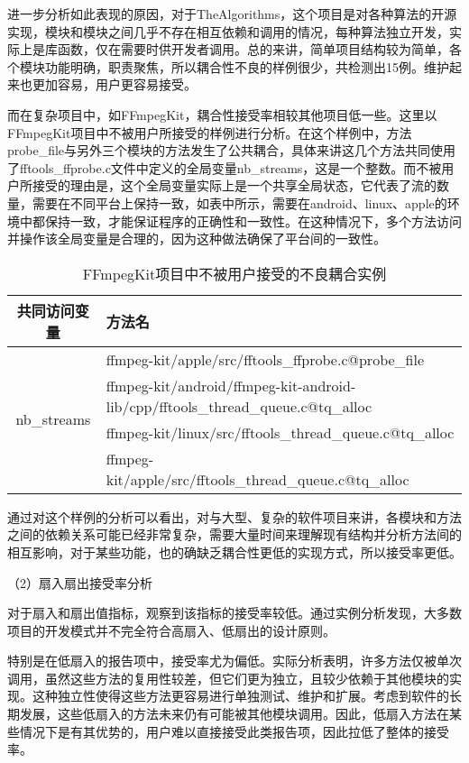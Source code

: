 进一步分析如此表现的原因，对于TheAlgorithms，这个项目是对各种算法的开源实现，模块和模块之间几乎不存在相互依赖和调用的情况，每种算法独立开发，实际上是库函数，仅在需要时供开发者调用。总的来讲，简单项目结构较为简单，各个模块功能明确，职责聚焦，所以耦合性不良的样例很少，共检测出15例。维护起来也更加容易，用户更容易接受。

而在复杂项目中，如FFmpegKit，耦合性接受率相较其他项目低一些。这里以FFmpegKit项目中不被用户所接受的样例进行分析。在这个样例中，方法probe\_file与另外三个模块的方法发生了公共耦合，具体来讲这几个方法共同使用了fftools\_ffprobe.c文件中定义的全局变量nb\_streams，这是一个整数。而不被用户所接受的理由是，这个全局变量实际上是一个共享全局状态，它代表了流的数量，需要在不同平台上保持一致，如表中所示，需要在android、linux、apple的环境中都保持一致，才能保证程序的正确性和一致性。在这种情况下，多个方法访问并操作该全局变量是合理的，因为这种做法确保了平台间的一致性。

\begin{table}[htbp]
\caption{FFmpegKit项目中不被用户接受的不良耦合实例}
\vspace{0.5em}\centering\wuhao
\begin{tabular}{cp{12cm}}
\toprule
共同访问变量 & 方法名 \\
\midrule
\multirow{4}{*}{nb\_streams} & ffmpeg-kit/apple/src/fftools\_ffprobe.c@probe\_file \\
                              & ffmpeg-kit/android/ffmpeg-kit-android-lib/cpp/fftools\_thread\_queue.c@tq\_alloc  \\
                              & ffmpeg-kit/linux/src/fftools\_thread\_queue.c@tq\_alloc  \\
                              & ffmpeg-kit/apple/src/fftools\_thread\_queue.c@tq\_alloc  \\
\bottomrule
\end{tabular}
\end{table}

通过对这个样例的分析可以看出，对与大型、复杂的软件项目来讲，各模块和方法之间的依赖关系可能已经非常复杂，需要大量时间来理解现有结构并分析方法间的相互影响，对于某些功能，也的确缺乏耦合性更低的实现方式，所以接受率更低。

（2）扇入扇出接受率分析

对于扇入和扇出值指标，观察到该指标的接受率较低。通过实例分析发现，大多数项目的开发模式并不完全符合高扇入、低扇出的设计原则。

特别是在低扇入的报告项中，接受率尤为偏低。实际分析表明，许多方法仅被单次调用，虽然这些方法的复用性较差，但它们更为独立，且较少依赖于其他模块的实现。这种独立性使得这些方法更容易进行单独测试、维护和扩展。考虑到软件的长期发展，这些低扇入的方法未来仍有可能被其他模块调用。因此，低扇入方法在某些情况下是有其优势的，用户难以直接接受此类报告项，因此拉低了整体的接受率。

